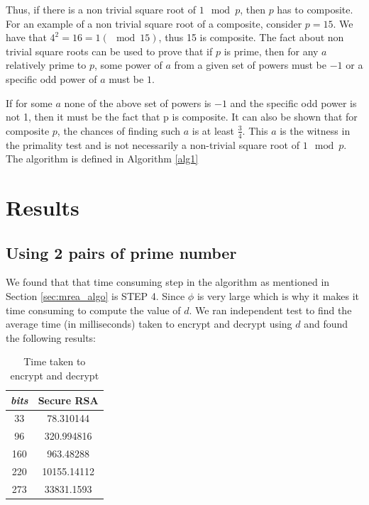 \documentclass[12pt,journal,compsoc]{IEEEtran}
\begin{document}
Thus, if there is a non trivial square root of $1 \mod p$, then $p$ has to composite. For an example of a non trivial square root of a composite, consider $p = 15$. We have that $4^{2} = 16 = 1 (\mod 15)$, thus 15 is composite. The fact about non trivial square roots can be used to prove that if $p$ is prime, then for any $a$ relatively prime to $p$, some power of $a$ from a given set of powers must be $-1$ or a specific odd power of $a$ must be $1$.


If for some $a$ none of the above set of powers is $-1$ and the specific odd power is not 1, then it must be the fact that p is composite. It can also be shown that for composite $p$, the chances of finding such $a$ is at least $\frac{3}{4}$. This $a$ is the witness in the primality test and is not necessarily a non-trivial square root of $1 \mod p$. The algorithm is defined in Algorithm \ref{alg1}


%	
 
\section{{Results}}

\subsection{Using 2 pairs of prime number}
We found that that time consuming step in the algorithm as mentioned in Section \ref{sec:mrea_algo} is STEP 4. Since $\phi$ is very large which is why it makes it time consuming to compute the value of $d$. We ran independent test to find the average time (in milliseconds) taken to encrypt and decrypt using $d$ and found the following results:

\begin{table}[ht]
	\begin{center}
	\begin{tabular}{|c|c|}
    	\hline
       		\emph{bits}	&		Secure RSA\\
	\hline
    		33			&	78.310144\\
		96			&	320.994816\\
		160			&	963.48288\\
		220			&	10155.14112\\
		273			&	33831.1593\\
	\hline
	\end{tabular}
	\end{center}
	\caption{Time taken to encrypt and decrypt}
	\label{table:rsa_with_d}

\end{table}
\end{document}
